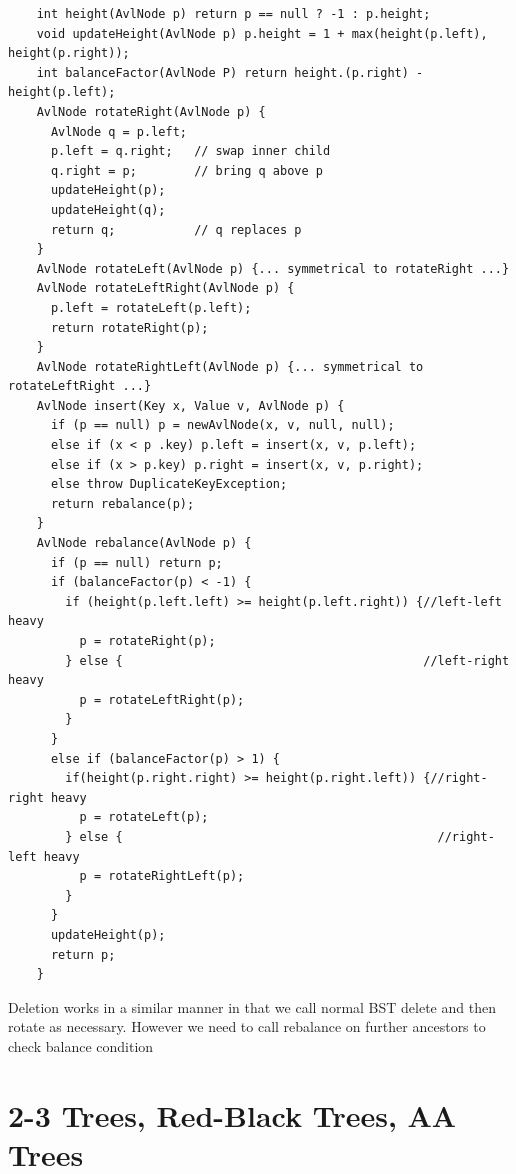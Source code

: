 \documentclass{article}
\begin{document}
  \begin{lstlisting}
    int height(AvlNode p) return p == null ? -1 : p.height;
    void updateHeight(AvlNode p) p.height = 1 + max(height(p.left), height(p.right));
    int balanceFactor(AvlNode P) return height.(p.right) - height(p.left);
    AvlNode rotateRight(AvlNode p) {
      AvlNode q = p.left;
      p.left = q.right;   // swap inner child
      q.right = p;        // bring q above p
      updateHeight(p);
      updateHeight(q);
      return q;           // q replaces p
    }
    AvlNode rotateLeft(AvlNode p) {... symmetrical to rotateRight ...}
    AvlNode rotateLeftRight(AvlNode p) {
      p.left = rotateLeft(p.left);
      return rotateRight(p);
    }
    AvlNode rotateRightLeft(AvlNode p) {... symmetrical to rotateLeftRight ...}
    AvlNode insert(Key x, Value v, AvlNode p) {
      if (p == null) p = newAvlNode(x, v, null, null);
      else if (x < p .key) p.left = insert(x, v, p.left);
      else if (x > p.key) p.right = insert(x, v, p.right);
      else throw DuplicateKeyException;
      return rebalance(p);
    }
    AvlNode rebalance(AvlNode p) {
      if (p == null) return p;
      if (balanceFactor(p) < -1) {
        if (height(p.left.left) >= height(p.left.right)) {//left-left heavy
          p = rotateRight(p);
        } else {                                          //left-right heavy
          p = rotateLeftRight(p);
        }
      }
      else if (balanceFactor(p) > 1) {
        if(height(p.right.right) >= height(p.right.left)) {//right-right heavy
          p = rotateLeft(p);
        } else {                                            //right-left heavy
          p = rotateRightLeft(p);
        }
      }
      updateHeight(p);
      return p;
    }
  \end{lstlisting}
  Deletion works in a similar manner in that we call normal BST delete and then rotate as necessary. However we need to call rebalance on further ancestors to check balance condition
  \newpage 
  \section{2-3 Trees, Red-Black Trees, AA Trees}
\end{document}
